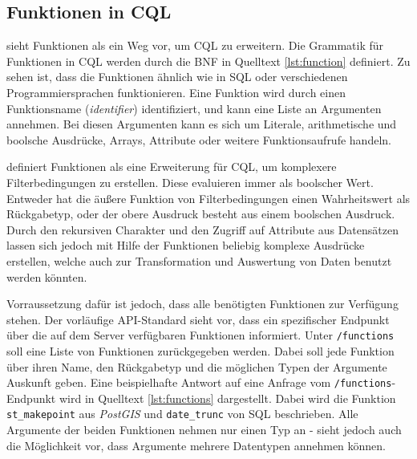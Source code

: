 \newcommand{\rfgfrjfn}{\footnote{\textcite{ogcFiltering}, \texttt{/req/functions/get-functions-response-json}}}

\subsection{Funktionen in \ac{CQL}}
\label{sec:functions}

 sieht Funktionen als ein Weg vor, um \ac{CQL} zu erweitern. Die Grammatik
für Funktionen in \ac{CQL} werden durch die \ac{BNF} in Quelltext \ref{lst:function} definiert.
Zu sehen ist, dass die Funktionen ähnlich wie in \ac{SQL} oder verschiedenen Programmiersprachen
funktionieren. Eine Funktion wird durch einen Funktionsname (\textit{identifier})
identifiziert, und kann eine Liste an Argumenten annehmen. Bei diesen Argumenten kann es sich um
Literale, arithmetische und boolsche Ausdrücke, Arrays, Attribute oder weitere Funktionsaufrufe handeln.



 definiert Funktionen als eine Erweiterung für \ac{CQL}, um komplexere
Filterbedingungen zu erstellen. Diese evaluieren immer als boolscher Wert. Entweder hat die äußere
Funktion von Filterbedingungen einen Wahrheitswert als Rückgabetyp, oder der obere Ausdruck besteht
aus einem boolschen Ausdruck. Durch den rekursiven Charakter und den Zugriff auf Attribute aus
Datensätzen lassen sich jedoch mit Hilfe der Funktionen beliebig komplexe Ausdrücke
erstellen, welche auch zur Transformation und Auswertung von Daten benutzt werden könnten.

Vorraussetzung dafür ist jedoch, dass alle benötigten Funktionen zur Verfügung stehen. Der
vorläufige \ac{API}-Standard sieht vor, dass ein spezifischer Endpunkt über die auf dem Server
verfügbaren Funktionen informiert. Unter \texttt{/functions} soll eine Liste von Funktionen
zurückgegeben werden. Dabei soll jede Funktion über ihren Name, den Rückgabetyp und die möglichen
Typen der Argumente Auskunft geben. Eine beispielhafte Antwort auf eine Anfrage vom
\texttt{/functions}-Endpunkt wird in Quelltext \ref{lst:functions} dargestellt. Dabei wird die
Funktion \texttt{st\_makepoint} aus \textit{PostGIS} und \texttt{date\_trunc} von \ac{SQL}
beschrieben. Alle Argumente der beiden Funktionen nehmen nur einen Typ an - 
sieht jedoch auch die Möglichkeit vor, dass Argumente mehrere Datentypen annehmen können.

